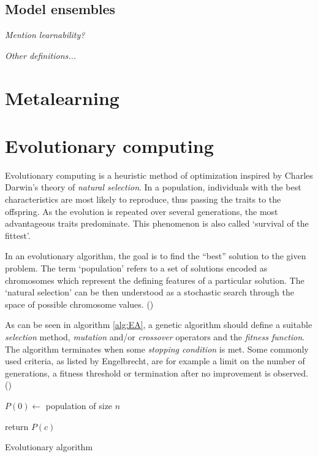 \subsection{Model ensembles}
\textit{Mention learnability?}

\textit{Other definitions...}

\section{Metalearning}


\section{Evolutionary computing}
Evolutionary computing is a heuristic method of optimization inspired by Charles Darwin's theory of \textit{natural selection}. \cite{darwin} In a population, individuals with the best characteristics are most likely to reproduce, thus passing the traits to the offspring. As the evolution is repeated over several generations, the most advantageous traits predominate. This phenomenon is also called `survival of the fittest'. %

In an evolutionary algorithm, the goal is to find the ``best'' solution to the given problem. The term `population' refers to a set of solutions encoded as chromosomes which represent the defining features of a particular solution. The `natural selection' can be then understood as a stochastic search through the space of possible chromosome values. (\cite{Engelbrecht:2007:CII:1557464}) %

As can be seen in algorithm \ref{alg:EA}, a genetic algorithm should define a suitable \textit{selection} method, \textit{mutation} and/or \textit{crossover} operators and the \textit{fitness function}. The algorithm terminates when some \textit{stopping condition} is met. Some commonly used criteria, as listed by Engelbrecht, are for example a limit on the number of generations, a fitness threshold or termination after no improvement is observed. (\citep{Engelbrecht:2007:CII:1557464})

\begin{algorithm}
\DontPrintSemicolon
  \;
  $P(0) \longleftarrow$ population of size $n$

  \;
  return $P(c)$  
\caption{Evolutionary algorithm\label{alg:EA}}
\end{algorithm}

